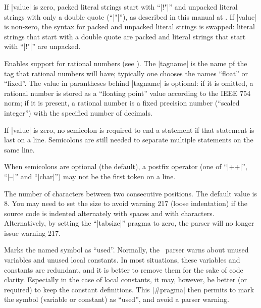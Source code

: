          \lbreak {}
                If |value| is zero, packed literal strings start with ``|!"|''
                and unpacked literal strings with only a double quote
                (``|"|''), as described in this manual at .
                If |value| is non-zero, the syntax for packed and unpacked
                literal strings is swapped: literal strings that start with
                a double quote are packed and literal strings that start
                with ``|!"|'' are unpacked.

         \lbreak {}
                Enables support for rational numbers (see ).
                The |tagname| is the name pf the tag that rational numbers will
                have; typically one chooses the names ``float'' or ``fixed''.
                The value in parantheses behind |tagname| is optional: if it
                is omitted, a rational number is stored as a ``floating point''
                value according to the IEEE 754 norm; if it is present, a
                rational number is a fixed precision number (``scaled integer'')
                with the specified number of decimals.

         \lbreak {}
                If |value| is zero, no semicolon is required to end a statement
                if that statement is last on a line. Semicolons are still needed
                to separate multiple statements on the same line.

                When semicolons are optional (the default), a postfix operator
                (one of ``|++|'', ``|--|''  and ``|char|'') may not be the first token
                on a line.

         \lbreak {}
                The number of characters between two consecutive 
                positions. The default value is 8. You may need to set the
                 size to avoid warning 217 (loose indentation)
                if the source code is indented alternately with spaces and
                with  characters. Alternatively, by setting the
                ``|tabsize|'' pragma to zero, the parser will no longer issue
                warning 217.

         \lbreak {}
                Marks the named symbol as ``used''. Normally, the \Small\ parser
                warns about unused variables and unused local constants. In
                most situations, these variables and constants are redundant,
                and it is better to remove them for the sake of code clarity.
                Especially in the case of local constants, it may, however,
                be better (or required) to keep the constant definitions. This
                |#pragma| then permits to mark the symbol (variable or constant)
                as ``used'', and avoid a parser warning.

